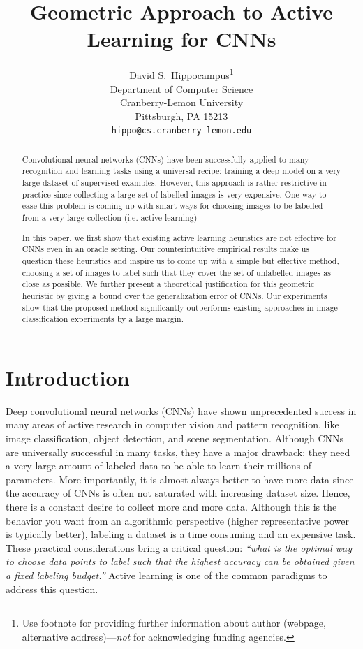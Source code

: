 \documentclass{article}
\title{Geometric Approach to Active Learning for CNNs}
\author{
  David S.~Hippocampus\thanks{Use footnote for providing further
    information about author (webpage, alternative
    address)---\emph{not} for acknowledging funding agencies.} \\
  Department of Computer Science\\
  Cranberry-Lemon University\\
  Pittsburgh, PA 15213 \\
  \texttt{hippo@cs.cranberry-lemon.edu} \\
}
\makeatletter
\newcommand*{\ie}{i.e.\@\xspace}
\makeatother
\begin{document}

\maketitle

\begin{abstract}
Convolutional neural networks (CNNs) have been successfully applied to many recognition and learning tasks using a universal recipe; training a deep model on a very large dataset of supervised examples. However, this approach is rather restrictive in practice since collecting a large set of labelled images is very expensive. One way to ease this problem is coming up with smart ways for choosing images to be labelled from a very large collection (\ie active learning)

In this paper, we first show that existing active learning heuristics are not effective for CNNs even in an oracle setting. Our counterintuitive empirical results make us question these heuristics and inspire us to come up with a simple but effective method, choosing a set of images to label such that they cover the set of unlabelled images as close as possible. We further present a theoretical justification for this geometric heuristic by giving a bound over the generalization error of CNNs. Our experiments show that the proposed method significantly outperforms existing approaches in image classification experiments by a large margin.
\end{abstract}

\section{Introduction}
Deep convolutional neural networks (CNNs) have shown unprecedented success in many areas of active research in computer vision and pattern recognition. like image classification, object detection, and scene segmentation. Although CNNs are universally successful in many tasks, they have a major drawback; they need a very large amount of labeled data to be able to learn their millions of parameters. More importantly, it is almost always better to have more data since the accuracy of CNNs is often not saturated with increasing dataset size. Hence, there is a constant desire to collect more and more data. Although this is the behavior you want from an algorithmic perspective (higher representative power is typically better), labeling a dataset is a time consuming and an expensive task. These practical considerations bring a critical question: \emph{``what is the optimal way to choose data points to label such that the highest accuracy can be obtained given a fixed labeling budget.''} Active learning is one of the common paradigms to address this question.
\end{document}
